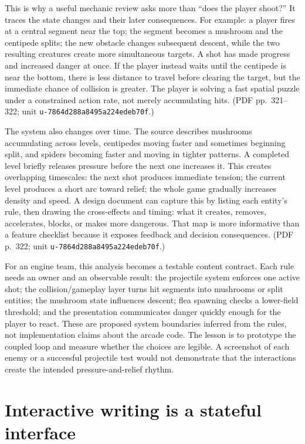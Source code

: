 This is why a useful mechanic review asks more than ``does the player shoot?'' It traces the state changes and their later consequences. For example: a player fires at a central segment near the top; the segment becomes a mushroom and the centipede splits; the new obstacle changes subsequent descent, while the two resulting creatures create more simultaneous targets. A shot has made progress and increased danger at once. If the player instead waits until the centipede is near the bottom, there is less distance to travel before clearing the target, but the immediate chance of collision is greater. The player is solving a fast spatial puzzle under a constrained action rate, not merely accumulating hits. (PDF pp.~321--322; unit \texttt{u-7864d288a8495a224edeb70f}.)

The system also changes over time. The source describes mushrooms accumulating across levels, centipedes moving faster and sometimes beginning split, and spiders becoming faster and moving in tighter patterns. A completed level briefly releases pressure before the next one increases it. This creates overlapping timescales: the next shot produces immediate tension; the current level produces a short arc toward relief; the whole game gradually increases density and speed. A design document can capture this by listing each entity's rule, then drawing the cross-effects and timing: what it creates, removes, accelerates, blocks, or makes more dangerous. That map is more informative than a feature checklist because it exposes feedback and decision consequences. (PDF p.~322; unit \texttt{u-7864d288a8495a224edeb70f}.)

For an engine team, this analysis becomes a testable content contract. Each rule needs an owner and an observable result: the projectile system enforces one active shot; the collision/gameplay layer turns hit segments into mushrooms or split entities; the mushroom state influences descent; flea spawning checks a lower-field threshold; and the presentation communicates danger quickly enough for the player to react. These are proposed system boundaries inferred from the rules, not implementation claims about the arcade code. The lesson is to prototype the coupled loop and measure whether the choices are legible. A screenshot of each enemy or a successful projectile test would not demonstrate that the interactions create the intended pressure-and-relief rhythm.

\section{Interactive writing is a stateful interface}\label{06-engine-ii-ch046-interactive-writing-is-a-stateful-interface}

